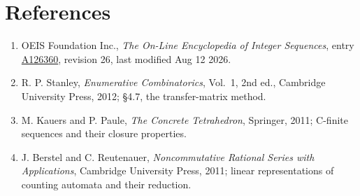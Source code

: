 \documentclass[11pt]{article}
\theoremstyle{definition}
\begin{document}
\section{References}

\begin{enumerate}

\item OEIS Foundation Inc., \emph{The On-Line Encyclopedia of Integer Sequences}, entry \href{https://oeis.org/A126360}{A126360}, revision 26, last modified Aug 12 2026.

\item R. P. Stanley, \emph{Enumerative Combinatorics}, Vol.~1, 2nd ed., Cambridge University Press, 2012; \S4.7, the transfer-matrix method.

\item M. Kauers and P. Paule, \emph{The Concrete Tetrahedron}, Springer, 2011; C-finite sequences and their closure properties.

\item J. Berstel and C. Reutenauer, \emph{Noncommutative Rational Series with Applications}, Cambridge University Press, 2011; linear representations of counting automata and their reduction.

\end{enumerate}
\end{document}

